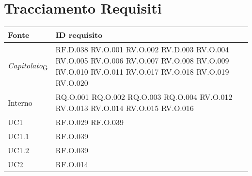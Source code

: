 \section{Tracciamento Requisiti}
\begin{table}[H]
\centering
    \begin{tabular}{|C{3.0cm}|C{3.0cm}|}
        \hline
        \textbf{Fonte} & 
        \textbf{ID requisito} \\
        \hline
        \textit{Capitolato}\textsubscript{G} &  
        RF.D.038 \newline 
        RV.O.001 \newline 
        RV.O.002 \newline 
        RV.D.003 \newline 
        RV.O.004 \newline 
        RV.O.005 \newline 
        RV.O.006 \newline 
        RV.O.007 \newline 
        RV.O.008 \newline 
        RV.O.009 \newline 
        RV.O.010 \newline
        RV.O.011 \newline  
        RV.O.017 \newline 
        RV.O.018 \newline 
        RV.O.019 \newline 
        RV.O.020 \\
        \hline
        Interno & 
        RQ.O.001 \newline
        RQ.O.002 \newline
        RQ.O.003 \newline
        RQ.O.004 \newline
        RV.O.012 \newline
        RV.O.013 \newline
        RV.O.014 \newline
        RV.O.015 \newline
        RV.O.016 \\
        \hline
        UC1 &
        RF.O.029 \newline
        RF.O.039 \\
        \hline
        UC1.1 &
        RF.O.039 \\
        \hline
        UC1.2 &
        RF.O.039 \\
        \hline
        UC2 &
        RF.O.014 \newline

\end{tabular}
\end{table}
